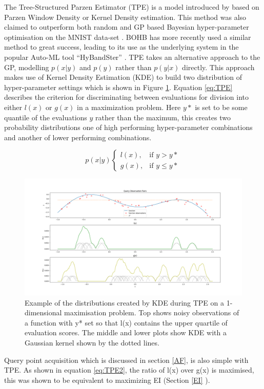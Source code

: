 			The Tree-Structured Parzen Estimator (TPE) is a model introduced by \cite{20} based on Parzen Window Density or Kernel Density estimation. This method was also claimed to outperform both random and GP based Bayesian hyper-parameter optimisation on the MNIST data-set \cite{20}. BOHB\cite{32} has more recently used a similar method to great success, leading to its use as the underlying system in the popular Auto-ML tool “HyBandSter” \cite{34}.
			TPE takes an alternative approach to the GP, modelling \(p(x|y)\) and \(p(y)\) rather than \(p(y|x)\) directly. This approach makes use of Kernel Density Estimation (KDE) to build two distribution of hyper-parameter settings which is shown in Figure \ref{fig:tpe1}. Equation \ref{eq:TPE} describes the criterion for discriminating between evaluations for division into either \(l(x)\) or \(g(x)\) in a maximization problem. Here \(y*\) is set to be some quantile of the evaluations \(y\) rather than the maximum, this creates two probability distributions one of high performing hyper-parameter combinations and another of lower performing combinations. 

			\begin{equation}\label{eq:TPE} p(x|y) \begin{cases}
									l(x), & \text{if } y>y*\\
									g(x), & \text{if } y\leq y*\end{cases} \end{equation}

			\begin{figure}[h]

			\includegraphics[trim=20 0 0 0 ,scale=0.25]{TPE1.png}

			\caption{Example of the distributions created by KDE during TPE on a 1-dimensional maximisation problem. Top shows noisy observations of a function with y* set so that l(x) contains the upper quartile of evaluation scores. The middle and lower plots show KDE with a Gaussian kernel shown by the dotted lines.}
			\label{fig:tpe1}
			\end{figure}
			Query point acquisition which is discussed in section \ref{AF}, is also simple with TPE. As shown in equation \ref{eq:TPE2}, the ratio of l(x) over g(x) is maximised, this was shown to be equivalent to maximizing EI \cite{20} (Section \ref{EI} ).

